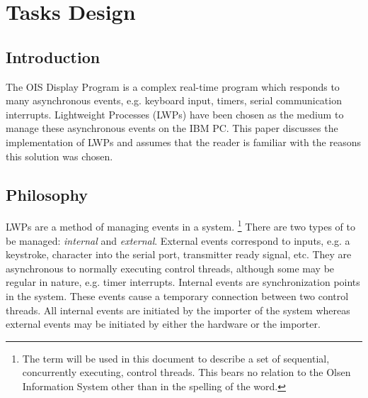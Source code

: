 %
%
%
%

\chapter{Tasks Design}

\section{Introduction}
The OIS Display Program is a complex real-time program which 
responds to many asynchronous events, e.g. keyboard input, timers,
serial communication interrupts.  Lightweight Processes (LWPs)
have been chosen as the medium to manage these asynchronous events
on the IBM PC.  This paper discusses the implementation of LWPs
and assumes that the reader is familiar with the reasons this
solution was chosen. 

\section{Philosophy}
LWPs are a method of managing events in a system.
\footnote{
    The term  will be used in this document to describe
    a set of sequential, concurrently executing, control threads.  
    This bears no relation to the Olsen Information System other 
    than in the spelling of the word.}
There are two types of  to be managed: 
{\em internal} and 
{\em external}.
External events correspond to inputs, e.g.
a keystroke, character into the serial port, transmitter ready signal, etc.
They are asynchronous to normally executing control threads,
although some may be regular in nature, e.g. timer interrupts.
Internal events are synchronization points in the system.  These
events cause a temporary connection between two control threads.
All internal events are initiated by the importer of the system
whereas external events may be initiated by either the hardware or the
importer.

